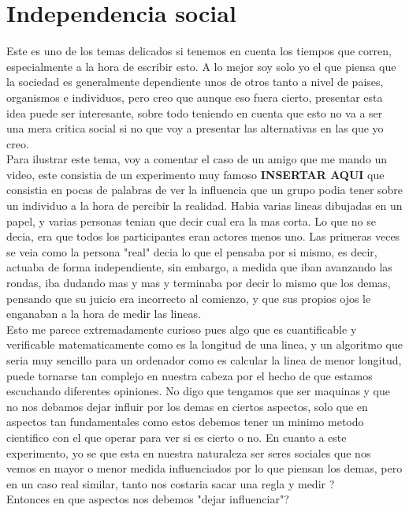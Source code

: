 \section{Independencia social}
Este es uno de los temas delicados si tenemos en cuenta los tiempos que corren, especialmente a la hora de escribir esto. A lo mejor soy solo yo el que piensa que la sociedad es generalmente dependiente unos de otros tanto a nivel de paises, organismos e individuos, pero creo que aunque eso fuera cierto, presentar esta idea puede ser interesante, sobre todo teniendo en cuenta que esto no va a ser una mera critica social si no que voy a presentar las alternativas en las que yo creo.\\

Para ilustrar este tema, voy a comentar el caso de un amigo que me mando un video, este consistia de un experimento muy famoso \textbf{INSERTAR AQUI} que consistia en pocas de palabras de ver la influencia que un grupo podia tener sobre un individuo a la hora de percibir la realidad. Habia varias lineas dibujadas en un papel, y varias personas tenian que decir cual era la mas corta. Lo que no se decia, era que todos los participantes eran actores menos uno. Las primeras veces se veia como la persona "real" decia lo que el pensaba por si mismo, es decir, actuaba de forma independiente, sin embargo, a medida que iban avanzando las rondas, iba dudando mas y mas y terminaba por decir lo mismo que los demas, pensando que su juicio era incorrecto al comienzo, y que sus propios ojos le enganaban a la hora de medir las lineas.\\

Esto me parece extremadamente curioso pues algo que es cuantificable y verificable matematicamente como es la longitud de una linea, y un algoritmo que seria muy sencillo para un ordenador como es calcular la linea de menor longitud, puede tornarse tan complejo en nuestra cabeza por el hecho de que estamos escuchando diferentes opiniones. No digo que tengamos que ser maquinas y que no nos debamos dejar influir por los demas en ciertos aspectos, solo que en aspectos tan fundamentales como estos debemos tener un minimo metodo cientifico con el que operar para ver si es cierto o no. En cuanto a este experimento, yo se que esta en nuestra naturaleza ser seres sociales que nos vemos en mayor o menor medida influenciados por lo que piensan los demas, pero en un caso real similar, tanto nos costaria sacar una regla y medir ? \\

Entonces en que aspectos nos debemos "dejar influenciar"? \\

